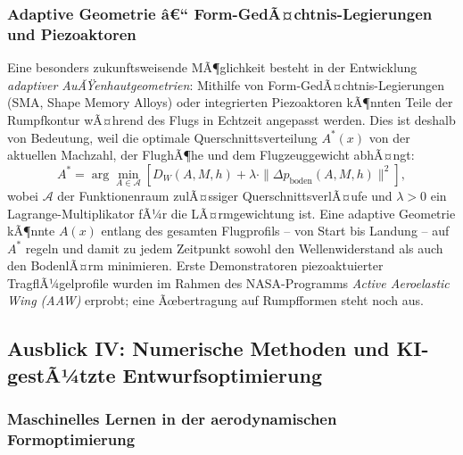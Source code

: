 ﻿\documentclass[12pt,a4paper]{article}
\theoremstyle{definition}
\theoremstyle{remark}
\begin{document}
\subsubsection{Adaptive Geometrie â€“ Form-GedÃ¤chtnis-Legierungen und Piezoaktoren}

Eine besonders zukunftsweisende MÃ¶glichkeit besteht in der Entwicklung \emph{adaptiver
AuÃŸenhautgeometrien}: Mithilfe von Form-GedÃ¤chtnis-Legierungen (SMA, Shape Memory Alloys)
oder integrierten Piezoaktoren kÃ¶nnten Teile der Rumpfkontur wÃ¤hrend des Flugs in Echtzeit
angepasst werden. Dies ist deshalb von Bedeutung, weil die optimale Querschnittsverteilung
$A^\ast(x)$ von der aktuellen Machzahl, der FlughÃ¶he und dem Flugzeuggewicht abhÃ¤ngt:
\begin{equation}
  A^\ast = \arg\min_{A \in \mathcal{A}} \left[ D_W(A, M, h) + \lambda \cdot \|\Delta p_\text{boden}(A, M, h)\|^2 \right],
  \label{eq:adaptiv_opt}
\end{equation}
wobei $\mathcal{A}$ der Funktionenraum zulÃ¤ssiger QuerschnittsverlÃ¤ufe und $\lambda > 0$
ein Lagrange-Multiplikator fÃ¼r die LÃ¤rmgewichtung ist. Eine adaptive Geometrie kÃ¶nnte
$A(x)$ entlang des gesamten Flugprofils -- von Start bis Landung -- auf $A^\ast$ regeln
und damit zu jedem Zeitpunkt sowohl den Wellenwiderstand als auch den BodenlÃ¤rm minimieren.
Erste Demonstratoren piezoaktuierter TragflÃ¼gelprofile wurden im Rahmen des NASA-Programms
\emph{Active Aeroelastic Wing (AAW)} erprobt; eine Ãœbertragung auf Rumpfformen steht noch aus.

\subsection{Ausblick IV: Numerische Methoden und KI-gestÃ¼tzte Entwurfsoptimierung}
\label{sec:ausblick_ki}

\subsubsection{Maschinelles Lernen in der aerodynamischen Formoptimierung}
\end{document}
